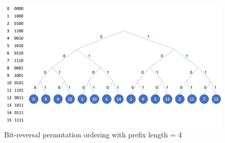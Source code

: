 \begin{figure}[!b]
\centering
  \includegraphics[width=15cm]{figures/bit_reversal_permutation_ordering.png}
  \caption{Bit-reversal permutation ordering with prefix length = 4}
  \label{fig:bitreversalpermutationordering}
\end{figure}